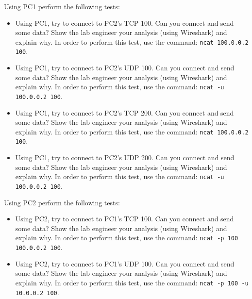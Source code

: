 \documentclass[pdftex,12pt,a4paper]{article}
\begin{document}
                Using PC1 perform the following tests:
                \begin{itemize}
                    \item Using PC1, try to connect to PC2's TCP 100. Can you
                        connect and send some data? Show the lab engineer your
                        analysis (using Wireshark) and explain why. In order to
                        perform this test, use the command: \texttt{ncat
                        100.0.0.2 100}.
                    \item Using PC1, try to connect to PC2's UDP 100. Can you
                        connect and send some data? Show the lab engineer your
                        analysis (using Wireshark) and explain why. In order to
                        perform this test, use the command: \texttt{ncat
                        -u 100.0.0.2 100}.
                    \item Using PC1, try to connect to PC2's TCP 200. Can you
                        connect and send some data? Show the lab engineer your
                        analysis (using Wireshark) and explain why. In order to
                        perform this test, use the command: \texttt{ncat
                        100.0.0.2 100}.
                    \item Using PC1, try to connect to PC2's UDP 200. Can you
                        connect and send some data? Show the lab engineer your
                        analysis (using Wireshark) and explain why. In order to
                        perform this test, use the command: \texttt{ncat
                        -u 100.0.0.2 100}.
                \end{itemize}
                
                Using PC2 perform the following tests:
                \begin{itemize}
                    \item Using PC2, try to connect to PC1's TCP 100. Can you
                        connect and send some data? Show the lab engineer your
                        analysis (using Wireshark) and explain why. In order to
                        perform this test, use the command: \texttt{ncat -p 100
                        100.0.0.2 100}.
                    \item Using PC2, try to connect to PC1's UDP 100. Can you
                        connect and send some data? Show the lab engineer your
                        analysis (using Wireshark) and explain why. In order to
                        perform this test, use the command: \texttt{ncat -p 100
                        -u 10.0.0.2 100}.
                \end{itemize}
\end{document}
